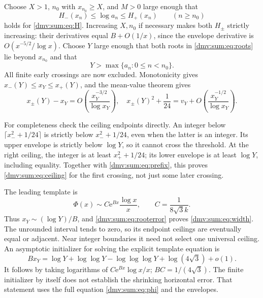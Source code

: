 \documentclass[11pt,letterpaper]{article}
\numberwithin{equation}{section}
\theoremstyle{definition}\newtheorem{definition}[theorem]{Definition}
\theoremstyle{remark}\newtheorem{remark}[theorem]{Remark}
\newcommand{\ee}{\mathrm e}
\begin{document}
Choose $X>1$, $n_0$ with $x_{n_0}\ge X$, and $M>0$ large enough that
\[
 H_-(x_n)\le\log a_n\le H_+(x_n)\qquad(n\ge n_0)
\]
holds for \eqref{dmv:sum:eq:H}. Increasing $X,n_0$ if necessary makes both $H_\pm$ strictly increasing: their derivatives equal $B+O(1/x)$, since the envelope derivative is $O(x^{-5/2}/\log x)$. Choose $Y$ large enough that both roots in \eqref{dmv:sum:eq:roots} lie beyond $x_{n_0}$ and that
\begin{equation}\label{dmv:sum:eq:prefix}
 Y>\max\{a_n:0\le n<n_0\}.
\end{equation}
All finite early crossings are now excluded. Monotonicity gives $x_-(Y)\le x_Y\le x_+(Y)$, and the mean-value theorem gives
\begin{equation}\label{dmv:sum:eq:rooterror}
 x_\pm(Y)-x_Y=O\!\left(\frac{x_Y^{-3/2}}{\log x_Y}\right),\quad
 x_\pm(Y)^2+\frac1{24}=v_Y+O\!\left(\frac{x_Y^{-1/2}}{\log x_Y}\right).
\end{equation}

For completeness check the ceiling endpoints directly. An integer below $\lceil x_-^2+1/24\rceil$ is strictly below $x_-^2+1/24$, even when the latter is an integer. Its upper envelope is strictly below $\log Y$, so it cannot cross the threshold. At the right ceiling, the integer is at least $x_+^2+1/24$; its lower envelope is at least $\log Y$, including equality. Together with \eqref{dmv:sum:eq:prefix}, this proves \eqref{dmv:sum:eq:ceiling} for the first crossing, not just some later crossing.

The leading template is
\[
 \Phi(x)\sim C\ee^{Bx}\frac{\log x}{x},\qquad C=\frac1{8\sqrt3 k}.
\]
Thus $x_Y\sim(\log Y)/B$, and \eqref{dmv:sum:eq:rooterror} proves \eqref{dmv:sum:eq:width}. The unrounded interval tends to zero, so its endpoint ceilings are eventually equal or adjacent. Near integer boundaries it need not select one universal ceiling. An asymptotic initializer for solving the explicit template equation is
\begin{equation}\label{dmv:sum:eq:initializer}
 Bx_Y=\log Y+\log\log Y-\log\log\log Y+\log(4\sqrt3)+o(1).
\end{equation}
It follows by taking logarithms of $C\ee^{Bx}\log x/x$; $BC=1/(4\sqrt3)$. The finite initializer by itself does not establish the shrinking horizontal error. That statement uses the full equation \eqref{dmv:sum:eq:phi} and the envelopes.
\end{document}
